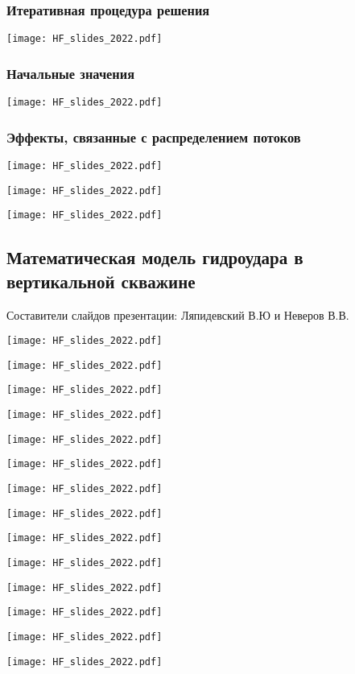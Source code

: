 \documentclass[main.tex]{subfiles}
\begin{document}
\subsubsection{Итеративная процедура решения}

\texttt{[image: HF\_slides\_2022.pdf]}

\subsubsection{Начальные значения}

\texttt{[image: HF\_slides\_2022.pdf]}

\subsubsection{Эффекты, связанные с распределением потоков}

\texttt{[image: HF\_slides\_2022.pdf]}

\texttt{[image: HF\_slides\_2022.pdf]}

\texttt{[image: HF\_slides\_2022.pdf]}


\subsection{Математическая модель гидроудара в вертикальной скважине}

Составители слайдов презентации: Ляпидевский В.Ю и Неверов В.В.

\texttt{[image: HF\_slides\_2022.pdf]}

\texttt{[image: HF\_slides\_2022.pdf]}

\texttt{[image: HF\_slides\_2022.pdf]}

\texttt{[image: HF\_slides\_2022.pdf]}

\texttt{[image: HF\_slides\_2022.pdf]}

\texttt{[image: HF\_slides\_2022.pdf]}

\texttt{[image: HF\_slides\_2022.pdf]}

\texttt{[image: HF\_slides\_2022.pdf]}

\texttt{[image: HF\_slides\_2022.pdf]}

\texttt{[image: HF\_slides\_2022.pdf]}

\texttt{[image: HF\_slides\_2022.pdf]}

\texttt{[image: HF\_slides\_2022.pdf]}

\texttt{[image: HF\_slides\_2022.pdf]}

\texttt{[image: HF\_slides\_2022.pdf]}
\end{document}
